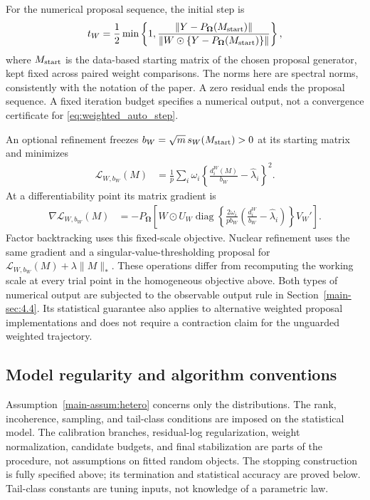 \documentclass[numsec,webpdf,modern,large,namedate]{oup-authoring-template}
\theoremstyle{plain}
\theoremstyle{remark}
\newcommand{\bOmega}{\bm{\Omega}}
\newif\ifmarkchanges
\newenvironment{revision}{\begingroup\ifmarkchanges\color{red}\fi}{\endgroup}
\begin{document}
\begin{revision}
For the numerical proposal sequence, the initial step is
\begin{align}
 t_W=\frac12\min\left\{1,
    \frac{\|Y-P_{\bOmega}(M_{\rm start})\|}
         {\|W\odot\{Y-P_{\bOmega}(M_{\rm start})\}\|}\right\},
 \label{eq:weighted_auto_step}
\end{align}
where $M_{\rm start}$ is the data-based starting matrix of the chosen
proposal generator, kept fixed across paired weight comparisons. The norms here are
spectral norms, consistently with the notation of the paper. A zero
residual ends the proposal sequence. A fixed iteration budget specifies a
numerical output, not a convergence certificate for
\eqref{eq:weighted_auto_step}.

An optional refinement freezes $b_W=\sqrt m\,s_W(M_{\rm start})>0$ at its
starting matrix and minimizes
\begin{align*}
 \mathcal L_{W,b_W}(M)
 &=\frac1p\sum_i\omega_i
       \left\{\frac{d_i^W(M)}{b_W}-\widehat\lambda_i\right\}^{2}.
\end{align*}
At a differentiability point its matrix gradient is
\begin{align}
 \nabla\mathcal L_{W,b_W}(M)
 &=-P_{\bOmega}\!\left[W\odot
 U_W\operatorname{diag}\left\{
 \frac{2\omega_i}{pb_W}
 \left(\frac{d_i^W}{b_W}-\widehat\lambda_i\right)\right\}V_W'\right].
 \label{eq:weighted_fixed_gradient}
\end{align}
Factor backtracking uses this fixed-scale objective. Nuclear refinement
uses the same gradient and a singular-value-thresholding proposal for
$\mathcal L_{W,b_W}(M)+\lambda\|M\|_*$. These operations differ from
recomputing the working scale at every trial point in the homogeneous
objective above. Both types of numerical output are subjected to the
observable output rule in Section~\ref{main-sec:4.4}. Its statistical guarantee
also applies to alternative weighted proposal implementations and does
not require a contraction claim for the unguarded weighted trajectory.

\subsection{Model regularity and algorithm conventions}
Assumption~\ref{main-assum:hetero} concerns only the distributions.
The rank, incoherence, sampling, and tail-class conditions are imposed
on the statistical model. The calibration branches, residual-log
regularization, weight normalization, candidate budgets, and final
stabilization are parts of the procedure, not assumptions on fitted
random objects. The stopping construction is fully specified above;
its termination and statistical accuracy are proved below. Tail-class
constants are tuning inputs, not knowledge of a parametric law.



\end{revision}
\end{document}
